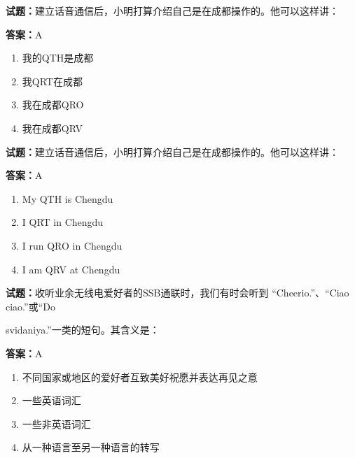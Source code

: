 \documentclass{ctexbook}
\begin{document}




\vspace{1em}

\textbf{试题：}建立话音通信后，小明打算介绍自己是在成都操作的。他可以这样讲： 

\textbf{答案：}A 

\begin{enumerate}[leftmargin=3em]
  \item 我的QTH是成都 

  \item 我QRT在成都 

  \item 我在成都QRO 

  \item 我在成都QRV 

\end{enumerate}





\vspace{1em}

\textbf{试题：}建立话音通信后，小明打算介绍自己是在成都操作的。他可以这样讲： 

\textbf{答案：}A 

\begin{enumerate}[leftmargin=3em]
  \item My QTH is Chengdu 

  \item I QRT in Chengdu 

  \item I run QRO in Chengdu 

  \item I am QRV at Chengdu 

\end{enumerate}





\vspace{1em}

\textbf{试题：}收听业余无线电爱好者的SSB通联时，我们有时会听到 “Cheerio.”、“Ciao ciao.”或“Do 


svidaniya.”一类的短句。其含义是： 

\textbf{答案：}A 

\begin{enumerate}[leftmargin=3em]
  \item 不同国家或地区的爱好者互致美好祝愿并表达再见之意 

  \item 一些英语词汇 

  \item 一些非英语词汇 

  \item 从一种语言至另一种语言的转写 

\end{enumerate}
\end{document}
